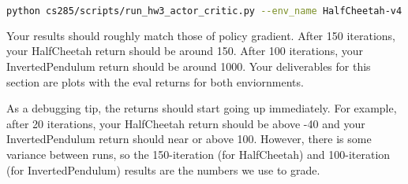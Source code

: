 \begin{lstlisting}[language=bash,breaklines=true]
python cs285/scripts/run_hw3_actor_critic.py --env_name HalfCheetah-v4 --ep_len 150 --discount 0.90 --scalar_log_freq 1 -n 150 -l 2 -s 32 -b 30000 -eb 1500 -lr 0.02 --exp_name q5_<ntu>_<ngsptu> -ntu <> -ngsptu <>
\end{lstlisting}
Your results should roughly match those of policy gradient.
After 150 iterations, your HalfCheetah return should be around 150.
After 100 iterations, your InvertedPendulum return should be around 1000.
Your deliverables for this section are plots with the eval returns for both enviornments.

As a debugging tip, the returns should start going up immediately.
For example, after 20 iterations, your HalfCheetah return should be above -40 and your InvertedPendulum return should near or above 100.
However, there is some variance between runs, so the 150-iteration (for HalfCheetah) and 100-iteration (for InvertedPendulum) results are the numbers we use to grade.